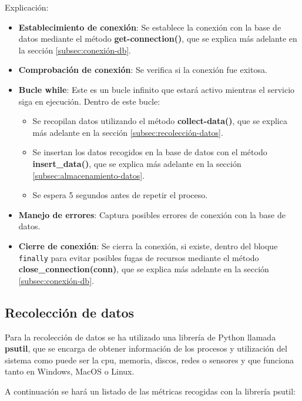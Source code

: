 \documentclass{article}
\begin{document}
Explicación:

\begin{itemize}
    \item \textbf{Establecimiento de conexión}: Se establece la conexión con la base de datos mediante el método \textbf{get-connection()}, que se explica más adelante en la sección \autoref{subsec:conexión-db}.
    \item \textbf{Comprobación de conexión}: Se verifica si la conexión fue exitosa.
    \item \textbf{Bucle while}: Este es un bucle infinito que estará activo mientras el servicio siga en ejecución. Dentro de este bucle:
    \begin{itemize}
        \item Se recopilan datos utilizando el método \textbf{collect-data()}, que se explica más adelante en la sección \autoref{subsec:recolección-datos}.
        \item Se insertan los datos recogidos en la base de datos con el método \textbf{insert\_data()}, que se explica más adelante en la sección \autoref{subsec:almacenamiento-datos}.
        \item Se espera 5 segundos antes de repetir el proceso.
    \end{itemize}
    \item \textbf{Manejo de errores}: Captura posibles errores de conexión con la base de datos.
    \item \textbf{Cierre de conexión}: Se cierra la conexión, si existe, dentro del bloque \texttt{finally} para evitar posibles fugas de recursos mediante el método \textbf{close\_connection(conn)}, que se explica más adelante en la sección \autoref{subsec:conexión-db}.
\end{itemize}

\subsection{Recolección de datos}\label{subsec:recolección-datos}

Para la recolección de datos se ha utilizado una librería de Python llamada \textbf{psutil}, que se encarga de obtener información de los procesos y utilización del sistema como puede ser la cpu, memoria, discos, redes o sensores y que funciona tanto en Windows, MacOS o Linux.

A continuación se hará un listado de las métricas recogidas con la librería psutil:
\end{document}
